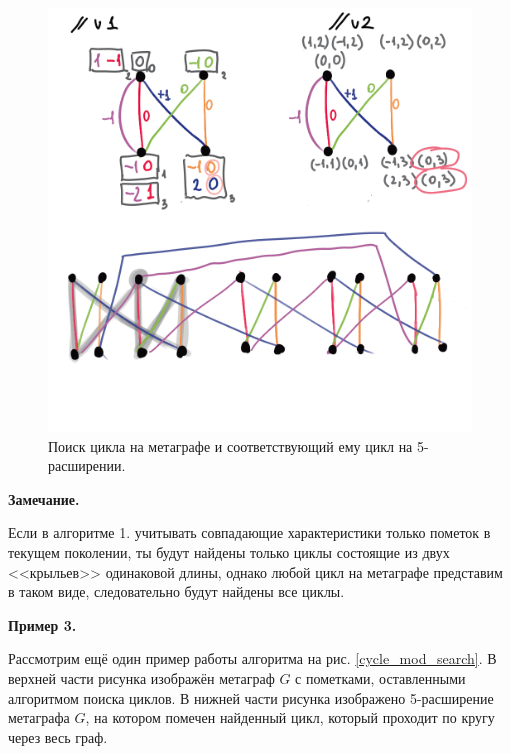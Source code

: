 \documentclass[14pt]{mmcs-article}
\begin{document}
\begin{figure}[H]
    \centering
    \includegraphics[scale=1.0]{cycle_search.png}
    \caption{ Поиск цикла на метаграфе и соответствующий ему цикл на 5-расширении. }\label{cycle_search}
\end{figure}

\textbf{Замечание.}

Если в алгоритме 1.  учитывать совпадающие характеристики только пометок в текущем поколении, ты будут найдены только циклы состоящие из двух <<крыльев>> одинаковой длины, однако любой цикл на метаграфе представим в таком виде, следовательно будут найдены все циклы.

\textbf{Пример 3.}


Рассмотрим ещё один пример работы алгоритма на рис. \ref{cycle_mod_search}. В верхней части рисунка изображён метаграф $G$ с пометками, оставленными алгоритмом поиска циклов. В нижней части рисунка изображено 5-расширение метаграфа $G$, на котором помечен найденный цикл, который проходит по кругу через весь граф.
\end{document}
